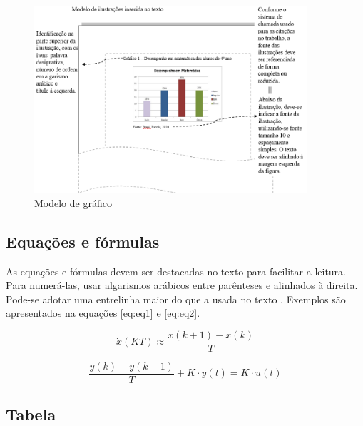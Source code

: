 \begin{figure}[!ht]
    \centering
    \caption{Modelo de gráfico}   \label{fig:fig2}
    \includegraphics[width = 0.90\textwidth]{images/___fig2.png}
\end{figure}

\subsection{Equações e fórmulas}
As equações e fórmulas devem ser destacadas no texto para facilitar a leitura.  Para numerá-las, usar algarismos arábicos entre parênteses e alinhados à direita. Pode-se adotar uma entrelinha maior do que a usada no texto \cite{abnt14724}.
Exemplos são apresentados na equações \ref{eq:eq1} e \ref{eq:eq2}.

\begin{equation}
    \dot{x}(KT)\approx \frac{x(k+1)-x(k)}{T}
    \label{eq:eq1}
\end{equation}

\begin{equation}
    \frac{y(k)-y(k-1)}{T}+K\cdot y(t)=K\cdot u(t)
    \label{eq:eq2}
\end{equation}

\subsection{Tabela}

